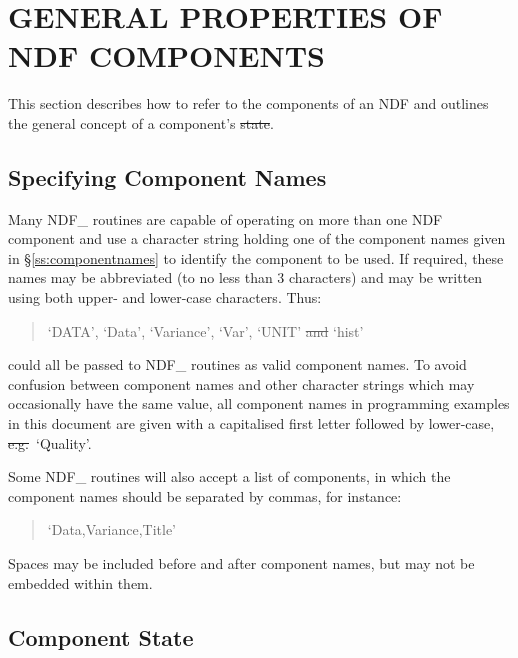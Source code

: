\section{GENERAL PROPERTIES OF NDF COMPONENTS}

This section describes how to refer to the components of an NDF and outlines 
the general concept of a component's \st{state}.

\subsection{\label{ss:componentnamespec}Specifying Component Names}

Many NDF\_ routines are capable of operating on more than one NDF component
and use a character string holding one of the component names given in
\S\ref{ss:componentnames} to identify the component to be used.
If required, these names may be abbreviated (to no less than 3  characters) and
may be written using both upper- and lower-case characters.
Thus:

\small
\begin{quote}
\begin{center}
`DATA', `Data', `Variance', `Var', `UNIT' \st{and\/} `hist'
\end{center}
\end{quote}
\normalsize

could all be passed to NDF\_ routines as valid component names.
To avoid confusion between component names and other character strings which may
occasionally have the same value, all component names in programming examples in
this document are given with a capitalised first  letter followed by lower-case,
\st{e.g.}\ `Quality'.

Some NDF\_ routines will also accept a list of components, in which the
component names should be separated by commas, for instance: 

\small
\begin{quote}
\begin{center}
`Data,Variance,Title'
\end{center}
\end{quote}
\normalsize

Spaces may be included before and after component names, but may not be 
embedded within them.

\subsection{Component State}

